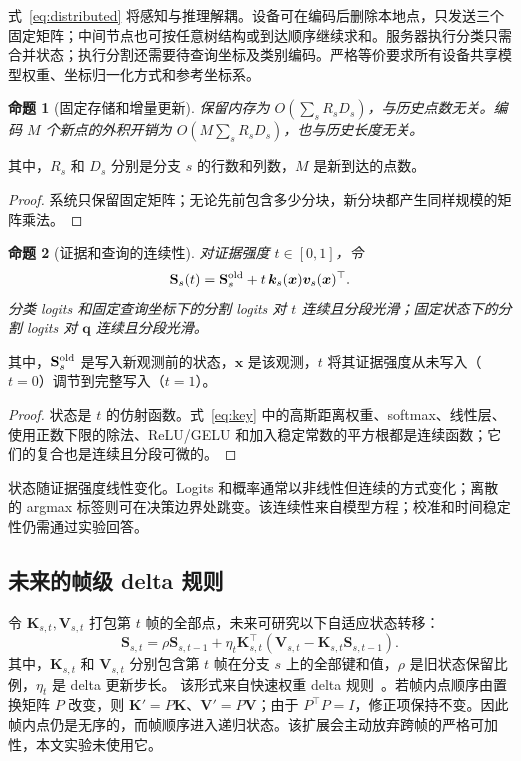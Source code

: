 \documentclass[UTF8,a4paper,11pt,fontset=windows]{ctexart}
\newtheorem{proposition}{命题}
\newcommand{\Sstate}{\mathbf{S}}
\begin{document}
式~\eqref{eq:distributed} 将感知与推理解耦。设备可在编码后删除本地点，只发送三个固定矩阵；中间节点也可按任意树结构或到达顺序继续求和。服务器执行分类只需合并状态；执行分割还需要待查询坐标及类别编码。严格等价要求所有设备共享模型权重、坐标归一化方式和参考坐标系。

\begin{proposition}[固定存储和增量更新]
保留内存为 $O(\sum_sR_sD_s)$，与历史点数无关。编码 $M$ 个新点的外积开销为 $O(M\sum_sR_sD_s)$，也与历史长度无关。
\end{proposition}
其中，$R_s$ 和 $D_s$ 分别是分支 $s$ 的行数和列数，$M$ 是新到达的点数。
\begin{proof}
系统只保留固定矩阵；无论先前包含多少分块，新分块都产生同样规模的矩阵乘法。
\end{proof}

\begin{proposition}[证据和查询的连续性]
对证据强度 $t\in[0,1]$，令
\begin{equation}
\Sstate_s(t)=\Sstate_s^{\rm old}+t\,\bm k_s(\bm x)\bm v_s(\bm x)^\top.
\label{eq:path}
\end{equation}
分类 logits 和固定查询坐标下的分割 logits 对 $t$ 连续且分段光滑；固定状态下的分割 logits 对 $\bm q$ 连续且分段光滑。
\end{proposition}
其中，$\Sstate_s^{\rm old}$ 是写入新观测前的状态，$\bm x$ 是该观测，$t$ 将其证据强度从未写入（$t=0$）调节到完整写入（$t=1$）。
\begin{proof}
状态是 $t$ 的仿射函数。式~\eqref{eq:key} 中的高斯距离权重、softmax、线性层、使用正数下限的除法、ReLU/GELU 和加入稳定常数的平方根都是连续函数；它们的复合也是连续且分段可微的。
\end{proof}
状态随证据强度线性变化。Logits 和概率通常以非线性但连续的方式变化；离散的 argmax 标签则可在决策边界处跳变。该连续性来自模型方程；校准和时间稳定性仍需通过实验回答。

\subsection{未来的帧级 delta 规则}

令 $\bm K_{s,t},\bm V_{s,t}$ 打包第 $t$ 帧的全部点，未来可研究以下自适应状态转移：
\begin{equation}
\Sstate_{s,t}=\rho\Sstate_{s,t-1}+\eta_t\bm K_{s,t}^{\top}
(\bm V_{s,t}-\bm K_{s,t}\Sstate_{s,t-1}).
\label{eq:delta}
\end{equation}
其中，$\bm K_{s,t}$ 和 $\bm V_{s,t}$ 分别包含第 $t$ 帧在分支 $s$ 上的全部键和值，$\rho$ 是旧状态保留比例，$\eta_t$ 是 delta 更新步长。
该形式来自快速权重 delta 规则~\cite{schlag2021linear}。若帧内点顺序由置换矩阵 $P$ 改变，则 $\bm K'=P\bm K$、$\bm V'=P\bm V$；由于 $P^\top P=I$，修正项保持不变。因此帧内点仍是无序的，而帧顺序进入递归状态。该扩展会主动放弃跨帧的严格可加性，本文实验未使用它。
\end{document}
